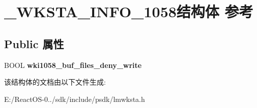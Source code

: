 \hypertarget{struct___w_k_s_t_a___i_n_f_o__1058}{}\section{\+\_\+\+W\+K\+S\+T\+A\+\_\+\+I\+N\+F\+O\+\_\+1058结构体 参考}
\label{struct___w_k_s_t_a___i_n_f_o__1058}
\subsection*{Public 属性}
\begin{DoxyCompactItemize}
\item 
\mbox{\label{struct___w_k_s_t_a___i_n_f_o__1058_a22eb0f1d0a1efc66aa51c813466c64ea}} 
B\+O\+OL {\bfseries wki1058\+\_\+buf\+\_\+files\+\_\+deny\+\_\+write}
\end{DoxyCompactItemize}


该结构体的文档由以下文件生成\+:\begin{DoxyCompactItemize}
\item 
E\+:/\+React\+O\+S-\/0../sdk/include/psdk/lmwksta.\+h\end{DoxyCompactItemize}
